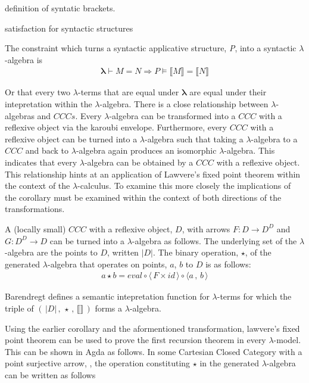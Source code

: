definition of syntatic brackets.

satisfaction for syntactic structures

The constraint which turns a syntactic applicative structure, \textit{P}, into a
syntactic $\lambda$-algebra is
\begin{align*}
    \bm{\lambda} \vdash M = N \Rightarrow P \models \llbracket M \rrbracket = \llbracket N
    \rrbracket
\end{align*}

Or that every two $\lambda$-terms that are equal under $\bm{\lambda}$ are equal
under their intepretation within the $\lambda$-algebra. There is a close
relationship between $\lambda$-algebras and $CCCs$. Every $\lambda$-algebra can be
transformed into a $CCC$ with a reflexive object via the karoubi
envelope. Furthermore, every $CCC$ with a reflexive object can be
turned into a $\lambda$-algebra such that taking a $\lambda$-algebra to a $CCC$
and back to $\lambda$-algebra again produces an isomorphic $\lambda$-algebra.
This indicates that every $\lambda$-algebra can be obtained by a $CCC$ with a
reflexive object. This relationship hints at an application of Lawvere's fixed
point theorem within the context of the $\lambda$-calculus. To examine this more
closely the implications of the corollary must be examined within the context of
both directions of the transformations.

A (locally small) $CCC$ with a reflexive object, $D$, with arrows $F : D
\rightarrow D^D$ and $G : D^D \rightarrow D$ can be turned into a
$\lambda$-algebra as follows. The underlying set of the $\lambda$-algebra are
the points to $D$, written $|D|$. The binary operation, $\star$, of the
generated $\lambda$-algebra that operates on points, $a$, $b$ to $D$ is as
follows:
\begin{align*}
    a \star b = eval \circ \langle \, F \times id \, \rangle \circ \langle a \,
    , \, b \,
    \rangle
\end{align*}

Barendregt defines a semantic intepretation function for $\lambda$-terms for
which the triple of $( \, |D| \, , \, \star \, , \, \llbracket \rrbracket \,)$
forms a $\lambda$-algebra.


Using the earlier corollary and the aformentioned transformation, lawvere's
fixed point theorem can be used to prove the first recursion theorem in every
$\lambda$-model. This can be shown in Agda as follows. In some Cartesian Closed
Category with a point surjective arrow, , the operation
constituting $\star$ in the generated $\lambda$-algebra can be written as
follows

